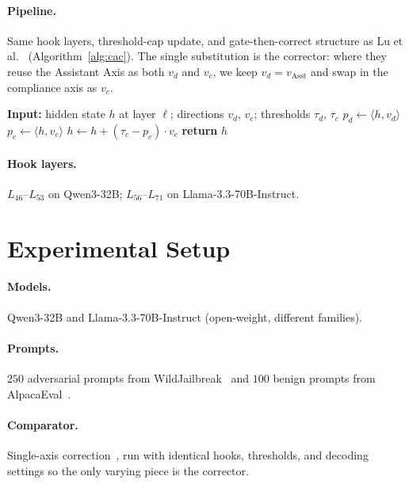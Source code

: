\documentclass{article}
\begin{document}
\paragraph{Pipeline.} Same hook layers, threshold-cap update, and
gate-then-correct structure as Lu et al.~\cite{lu2026assistant}
(Algorithm~\ref{alg:cac}). The single substitution is the corrector:
where they reuse the Assistant Axis as both $v_d$ and $v_c$, we keep
$v_d = v_{\mathrm{Asst}}$ and swap in the compliance axis as $v_c$.

\begin{algorithm}[h]
\caption{Cross-Axis Correction}
\label{alg:cac}
\begin{algorithmic}[1]
\STATE \textbf{Input:} hidden state $h$ at layer $\ell$;
       directions $v_d$, $v_c$; thresholds $\tau_d$, $\tau_c$
\STATE $p_d \gets \langle h, v_d \rangle$
    \STATE $p_c \gets \langle h, v_c \rangle$
        \STATE $h \gets h + (\tau_c - p_c) \cdot v_c$
    \ENDIF
\ENDIF
\STATE \textbf{return} $h$
\end{algorithmic}
\end{algorithm}

\paragraph{Hook layers.} $L_{46}$--$L_{53}$ on Qwen3-32B;
$L_{56}$--$L_{71}$ on Llama-3.3-70B-Instruct.

\section{Experimental Setup}
\label{sec:setup}

\paragraph{Models.} Qwen3-32B and Llama-3.3-70B-Instruct (open-weight,
different families).

\paragraph{Prompts.} $250$ adversarial prompts from
WildJailbreak~\cite{jiang2024wildjailbreak} and $100$ benign prompts
from AlpacaEval~\cite{li2023alpacaeval}.

\paragraph{Comparator.} Single-axis correction~\cite{lu2026assistant},
run with identical hooks, thresholds, and decoding settings so the only
varying piece is the corrector.
\end{document}
